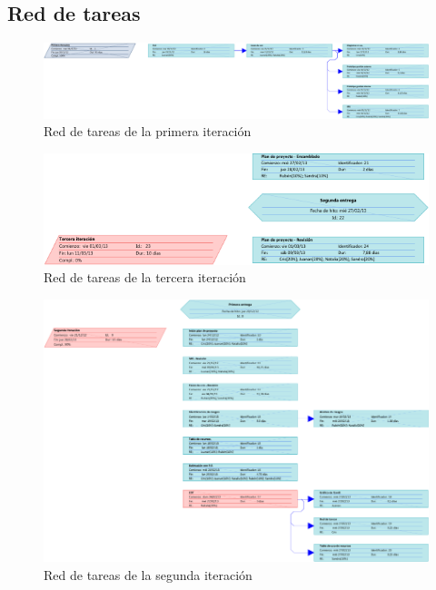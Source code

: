 \documentclass[11pt, a4paper, twoside, titlepage]{article}
\begin{document}
		\begin{landscape}
		\subsection{Red de tareas}
			\begin{figure}[H] \centering
			\vspace{1.1cm}
			\includegraphics[scale=1]{planific/redtareas1.pdf}
			\caption{Red de tareas de la primera iteración}
			\end{figure}

			\begin{figure}[H] \centering
			\vspace{1.1cm}
			\includegraphics[scale=1.2]{planific/redtareas3.pdf}
			\caption{Red de tareas de la tercera iteración}
			\end{figure}

			\begin{figure}[H] \centering
			\includegraphics[scale=1.45]{planific/redtareas2.pdf}
			\caption{Red de tareas de la segunda iteración}
			\end{figure}
		\end{landscape}
\end{document}
